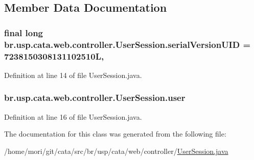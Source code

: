 \subsection{Member Data Documentation}
\hypertarget{classbr_1_1usp_1_1cata_1_1web_1_1controller_1_1_user_session_a85159fe8fe1d01723d32cdd37074bc5a}{
\subsubsection[{serial\+Version\+U\+I\+D}]{\setlength{\rightskip}{0pt plus 5cm}final long br.\+usp.\+cata.\+web.\+controller.\+User\+Session.\+serial\+Version\+U\+I\+D = 7238150308131102510\+L\hspace{0.3cm}{\ttfamily [static]}, {\ttfamily [private]}}}\label{classbr_1_1usp_1_1cata_1_1web_1_1controller_1_1_user_session_a85159fe8fe1d01723d32cdd37074bc5a}


Definition at line 14 of file User\+Session.\+java.

\hypertarget{classbr_1_1usp_1_1cata_1_1web_1_1controller_1_1_user_session_ae1952fcc882c83995c670f1223a8ef58}{
\subsubsection[{user}]{ br.\+usp.\+cata.\+web.\+controller.\+User\+Session.\+user\hspace{0.3cm}{\ttfamily [private]}}}\label{classbr_1_1usp_1_1cata_1_1web_1_1controller_1_1_user_session_ae1952fcc882c83995c670f1223a8ef58}


Definition at line 16 of file User\+Session.\+java.



The documentation for this class was generated from the following file\+:\begin{DoxyCompactItemize}
\item 
/home/mori/git/cata/src/br/usp/cata/web/controller/\hyperlink{_user_session_8java}{User\+Session.\+java}\end{DoxyCompactItemize}
